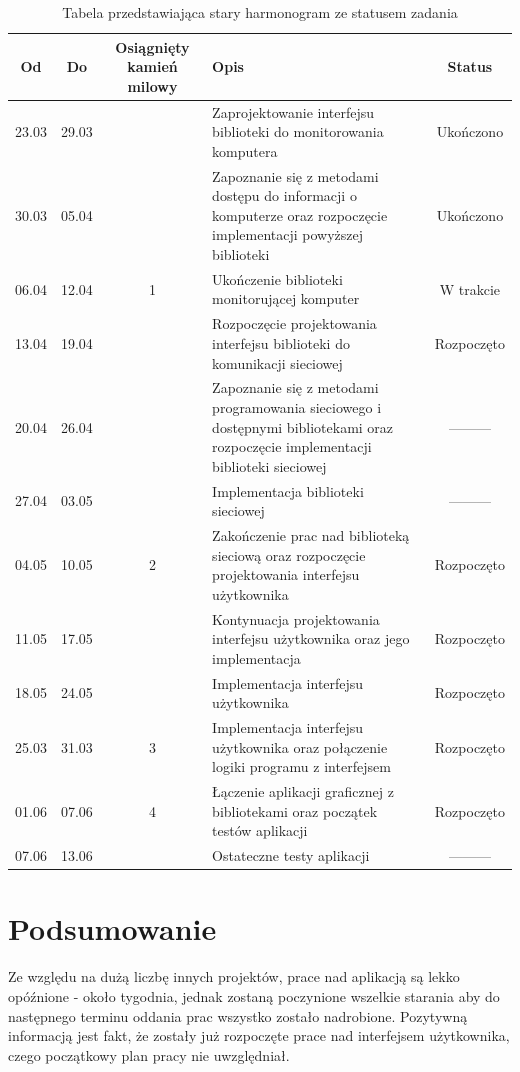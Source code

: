 \documentclass[a4paper]{article}
\begin{document}
		\begin{table}[h]
			\centering
			\begin{tabularx}{\linewidth}{|c|c|c|X|c|}
				\hline
				Od & Do & Osiągnięty kamień milowy & Opis & Status \\ \hline
				23.03 & 29.03 &  & Zaprojektowanie interfejsu biblioteki do monitorowania komputera & Ukończono  \\ \hline
				30.03 & 05.04 &  & Zapoznanie się z metodami dostępu do informacji o komputerze oraz rozpoczęcie implementacji powyższej biblioteki & Ukończono \\ \hline
				06.04 & 12.04 & 1 & Ukończenie biblioteki monitorującej komputer & W trakcie \\ \hline
				13.04 & 19.04 &   & Rozpoczęcie projektowania interfejsu biblioteki do komunikacji sieciowej & Rozpoczęto\\ \hline
				20.04 & 26.04 &  & Zapoznanie się z metodami programowania sieciowego i dostępnymi bibliotekami oraz  rozpoczęcie implementacji biblioteki sieciowej & --------- \\ \hline
				27.04 & 03.05 &  & Implementacja biblioteki sieciowej & --------- \\ \hline
				04.05 & 10.05 & 2 & Zakończenie prac nad biblioteką sieciową oraz rozpoczęcie projektowania interfejsu użytkownika & Rozpoczęto \\ \hline
				11.05 & 17.05 &    & Kontynuacja projektowania interfejsu użytkownika oraz jego implementacja & Rozpoczęto\\ \hline
				18.05 & 24.05 &  & Implementacja interfejsu użytkownika & Rozpoczęto\\ \hline
				25.03 & 31.03 & 3 & Implementacja interfejsu użytkownika oraz połączenie logiki programu z interfejsem & Rozpoczęto \\ \hline
				01.06 & 07.06 & 4 & Łączenie aplikacji graficznej z bibliotekami oraz początek testów aplikacji & Rozpoczęto \\ \hline
				07.06 & 13.06 &  & Ostateczne testy aplikacji & --------- \\ \hline
			\end{tabularx}
			\caption{Tabela przedstawiająca stary harmonogram ze statusem zadania}
			\label{tabela_harmonogram_stary}
		\end{table}

\section{Podsumowanie}
Ze względu na dużą liczbę innych projektów, prace nad aplikacją są lekko opóźnione - około tygodnia, jednak zostaną poczynione wszelkie starania aby do następnego terminu oddania prac wszystko zostało nadrobione. 
Pozytywną informacją jest fakt, że zostały już rozpoczęte prace nad interfejsem użytkownika, czego początkowy plan pracy nie uwzględniał.
\end{document}
